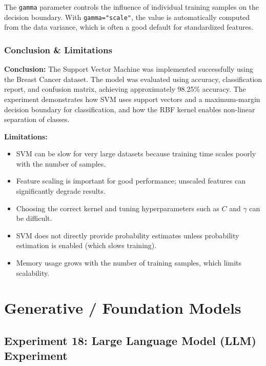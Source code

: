 \documentclass[a4paper,11pt]{article}
\begin{document}
\begin{itemize}
The \texttt{gamma} parameter controls the influence of individual training samples on the decision boundary. With \texttt{gamma="scale"}, the value is automatically computed from the data variance, which is often a good default for standardized features.

\subsubsection{Conclusion \& Limitations}

\textbf{Conclusion:} The Support Vector Machine was implemented successfully using the Breast Cancer dataset. The model was evaluated using accuracy, classification report, and confusion matrix, achieving approximately 98.25\% accuracy. The experiment demonstrates how SVM uses support vectors and a maximum-margin decision boundary for classification, and how the RBF kernel enables non-linear separation of classes.

\textbf{Limitations:}
\begin{itemize}
    \item SVM can be slow for very large datasets because training time scales poorly with the number of samples.
    \item Feature scaling is important for good performance; unscaled features can significantly degrade results.
    \item Choosing the correct kernel and tuning hyperparameters such as $C$ and $\gamma$ can be difficult.
    \item SVM does not directly provide probability estimates unless probability estimation is enabled (which slows training).
    \item Memory usage grows with the number of training samples, which limits scalability.
\end{itemize}


\section{Generative / Foundation Models}

\subsection{Experiment 18: Large Language Model (LLM) Experiment}


\end{itemize}
\end{document}
